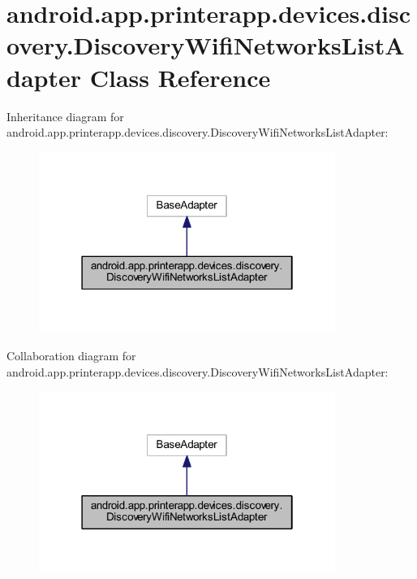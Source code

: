 \hypertarget{classandroid_1_1app_1_1printerapp_1_1devices_1_1discovery_1_1_discovery_wifi_networks_list_adapter}{}\section{android.\+app.\+printerapp.\+devices.\+discovery.\+Discovery\+Wifi\+Networks\+List\+Adapter Class Reference}
\label{classandroid_1_1app_1_1printerapp_1_1devices_1_1discovery_1_1_discovery_wifi_networks_list_adapter}


Inheritance diagram for android.\+app.\+printerapp.\+devices.\+discovery.\+Discovery\+Wifi\+Networks\+List\+Adapter\+:
\nopagebreak
\begin{figure}[H]
\begin{center}
\leavevmode
\includegraphics[width=274pt]{classandroid_1_1app_1_1printerapp_1_1devices_1_1discovery_1_1_discovery_wifi_networks_list_adapter__inherit__graph}
\end{center}
\end{figure}


Collaboration diagram for android.\+app.\+printerapp.\+devices.\+discovery.\+Discovery\+Wifi\+Networks\+List\+Adapter\+:
\nopagebreak
\begin{figure}[H]
\begin{center}
\leavevmode
\includegraphics[width=274pt]{classandroid_1_1app_1_1printerapp_1_1devices_1_1discovery_1_1_discovery_wifi_networks_list_adapter__coll__graph}
\end{center}
\end{figure}
